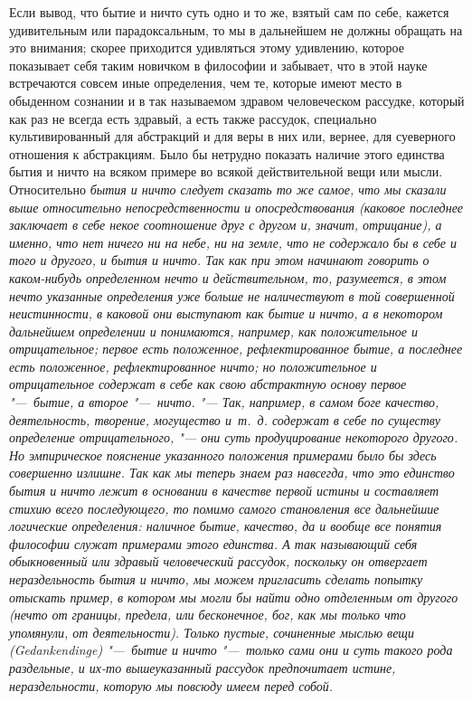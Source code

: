 Если вывод, что бытие и ничто суть одно и то же, взятый сам по себе, кажется
удивительным или парадоксальным, то мы в дальнейшем не должны обращать на
это внимания; скорее приходится удивляться этому удивлению, которое
показывает себя таким новичком в философии и забывает, что в этой науке
встречаются совсем иные определения, чем те, которые имеют место в
обыденном сознании и в так называемом здравом человеческом рассудке,
который как раз не всегда есть здравый, а есть также рассудок, специально
культивированный для абстракций и для веры в них или, вернее, для
суеверного отношения к абстракциям. Было бы нетрудно показать наличие этого
единства бытия и ничто на всяком примере во всякой действительной вещи или
мысли. Относительно \em{бытия} и
\em{ничто} следует сказать то же самое, что мы сказали
выше относительно непосредственности и опосредствования (каковое последнее
заключает в себе некое соотношение \em{друг с другом}
и, значит, \em{отрицание}), а именно, что
\em{нет ничего ни на небе, ни на земле, что не
содержало бы в себе и того и другого, и бытия и ничто}. Так как при этом
начинают говорить о \em{каком-нибудь определенном
нечто и действительном}, то, разумеется, в этом нечто указанные определения
уже больше не наличествуют в той совершенной неистинности, в каковой они
выступают как бытие и ничто, а в некотором дальнейшем определении и
понимаются, например, как \em{положительное} и
\em{отрицательное}; первое есть положенное,
рефлектированное бытие, а последнее есть положенное, рефлектированное
ничто; но положительное и отрицательное содержат в себе как свою
абстрактную основу первое "---~бытие, а второе "---~ничто. "--- Так, например, в
самом боге качество, \em{деятельность},
\em{творение}, \em{могущество}
и~т.~д. содержат в себе по существу определение отрицательного, "--- они суть
продуцирование некоторого \em{другого}. Но
эмпирическое пояснение указанного положения примерами было бы здесь
совершенно излишне. Так как мы теперь знаем раз навсегда, что это единство
бытия и ничто лежит в основании в качестве первой истины и составляет
стихию всего последующего, то помимо самого становления все дальнейшие
логические определения: наличное бытие, качество, да и вообще все понятия
философии служат примерами этого единства. А так называющий себя
обыкновенный или здравый человеческий рассудок, поскольку он отвергает
нераздельность бытия и ничто, мы можем пригласить сделать попытку отыскать
пример, в котором мы могли бы найти одно отделенным от другого (нечто от
границы, предела, или бесконечное, бог, как мы только что упомянули, от
деятельности). Только пустые, сочиненные мыслью вещи (Gedankendinge)
"---~бытие и ничто "---~только сами они и суть такого рода раздельные, и их-то
вышеуказанный рассудок предпочитает истине, нераздельности, которую мы
повсюду имеем перед собой.

